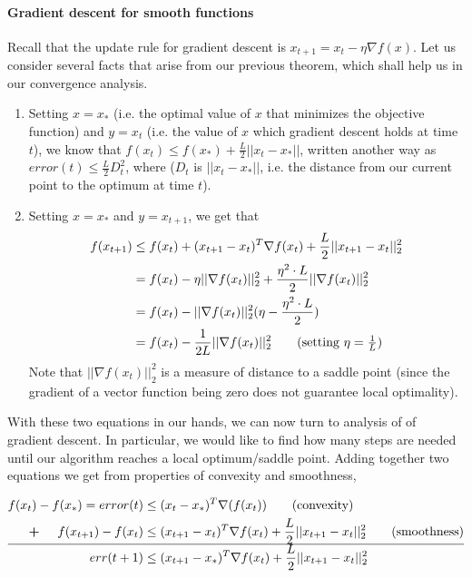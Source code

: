 \documentclass[11pt]{article}
\begin{document}
\paragraph{Gradient descent for smooth functions} Recall that the update rule for gradient descent is $x_{t+1} = x_t - \eta \nabla f(x)$. Let us consider several facts that arise from our previous theorem, which shall help us in our convergence analysis. 
\begin{enumerate}
\item Setting $x = x_*$ (i.e. the optimal value of $x$ that minimizes the objective function) and $y = x_t$ (i.e. the value of $x$ which gradient descent holds at time $t$), we know that $f(x_t) \leq f(x_*) + \frac{L}{2}||x_t-x_*||$, written another way as $error(t) \leq \frac{L}{2} D_t^2$, where ($D_t$ is $||x_t-x_*||$, i.e. the distance from our current point to the optimum at time $t$).
\item Setting $x = x_*$ and $y=x_{t+1}$, we get that 
\begin{align*}
    f(x_{t+1}) &\leq f(x_t) + (x_{t+1} - x_{t})^T\nabla f(x_t) + \frac{L}{2}||x_{t+1} - x_t||^2_2 \\
    &= f(x_t) - \eta ||\nabla f(x_t)||^2_2 + \frac{\eta^2 \cdot L}{2} ||\nabla f(x_t)||^2_2 \\
    &= f(x_t) - ||\nabla f(x_t)||^2_2(\eta - \frac{\eta^2 \cdot L}{2}) \\
    &= f(x_t) - \frac{1}{2L}||\nabla f(x_t)||^2_2 \tag{setting $\eta = \frac{1}{L}$} \\
\end{align*}
Note that $||\nabla f(x_t)||_2^2$ is a measure of distance to a saddle point (since the gradient of a vector function being zero does not guarantee local optimality).
\end{enumerate}

With these two equations in our hands, we can now turn to analysis of of gradient descent. In particular, we would like to find how many steps are needed until our algorithm reaches a local optimum/saddle point. Adding together two equations we get from properties of convexity and smoothness,

\begin{align*}
    f(x_t) - f(x_*) = error(t) &\leq (x_t - x_*)^T \nabla(f(x_t)) \tag{convexity}\\
    \textbf{+} \hspace{5mm}f(x_{t+1}) - f(x_t) &\leq (x_{t+1} - x_t)^T \nabla f(x_t) + \frac{L}{2} ||x_{t+1} - x_t||_2^2 \tag{smoothness}\\
    \hline
    err(t+1) &\leq (x_{t+1} - x_*)^T \nabla f(x_t) + \frac{L}{2} ||x_{t+1} - x_t||_2^2
\end{align*}
\end{document}
